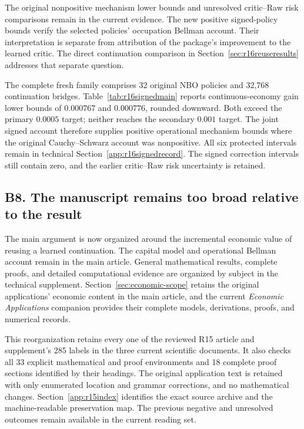 The original nonpositive mechanism lower bounds and unresolved critic--Raw risk comparisons remain in the current evidence. The new positive signed-policy bounds verify the selected policies' occupation Bellman account. Their interpretation is separate from attribution of the package's improvement to the learned critic. The direct continuation comparison in Section~\ref{sec:r16reuseresults} addresses that separate question.

The complete fresh family comprises 32 original NBO policies and 32,768 continuation bridges. Table~\ref{tab:r16signedmain} reports continuous-economy gain lower bounds of $0.000767$ and $0.000776$, rounded downward. Both exceed the primary $0.0005$ target; neither reaches the secondary $0.001$ target. The joint signed account therefore supplies positive operational mechanism bounds where the original Cauchy--Schwarz account was nonpositive. All six protected intervals remain in technical Section~\ref{app:r16signedrecord}. The signed correction intervals still contain zero, and the earlier critic--Raw risk uncertainty is retained.

\subsection*{B8. The manuscript remains too broad relative to the result}\label{resp:B8}
The main argument is now organized around the incremental economic value of reusing a learned continuation. The capital model and operational Bellman account remain in the main article. General mathematical results, complete proofs, and detailed computational evidence are organized by subject in the technical supplement. Section~\ref{sec:economic-scope} retains the original applications' economic content in the main article, and the current \emph{Economic Applications} companion provides their complete models, derivations, proofs, and numerical records.

This reorganization retains every one of the reviewed R15 article and supplement's 285 labels in the three current scientific documents. It also checks all 33 explicit mathematical and proof environments and 18 complete proof sections identified by their headings. The original application text is retained with only enumerated location and grammar corrections, and no mathematical changes. Section~\ref{app:r15index} identifies the exact source archive and the machine-readable preservation map. The previous negative and unresolved outcomes remain available in the current reading set.

